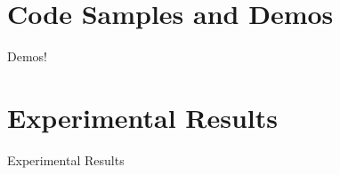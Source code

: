 \documentclass[xcolor=pdftex,t,11pt]{beamer}
\begin{document}
\section{Code Samples and Demos}

\begin{frame}{Demos!}

\end{frame}

\section{Experimental Results}
\begin{frame}{Experimental Results}
\vspace{-0.7cm}
\begin{center}
{\tiny

}
\end{center}
\end{frame}
\end{document}
